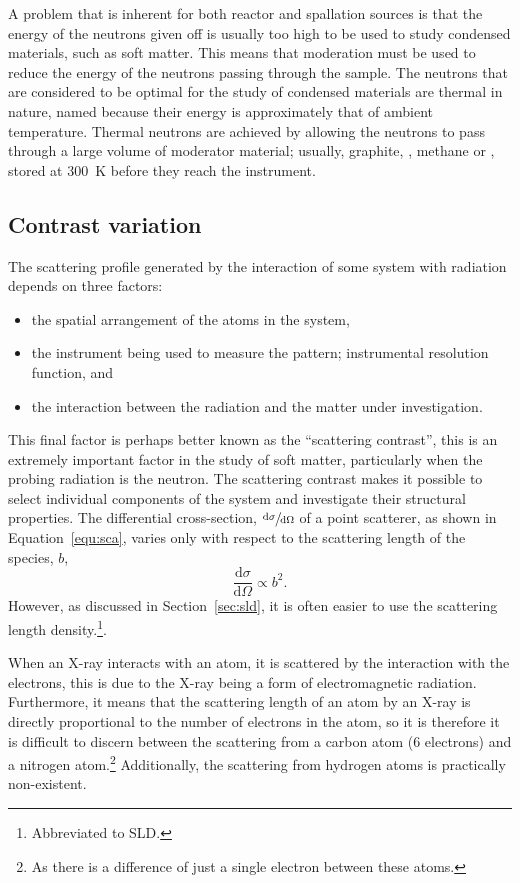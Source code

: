 A problem that is inherent for both reactor and spallation sources is that the energy of the neutrons given off is usually too high to be used to study condensed materials, such as soft matter.
This means that moderation must be used to reduce the energy of the neutrons passing through the sample.
The neutrons that are considered to be optimal for the study of condensed materials are thermal in nature, named because their energy is approximately that of ambient temperature.
Thermal neutrons are achieved by allowing the neutrons to pass through a large volume of moderator material; usually, graphite, , methane or , stored at \SI{300}{\kelvin} before they reach the instrument.

\subsection{Contrast variation}
\label{convar}
The scattering profile generated by the interaction of some system with radiation depends on three factors:
%
\begin{itemize}
    \item the spatial arrangement of the atoms in the system,
    \item the instrument being used to measure the pattern; instrumental resolution function, and
    \item the interaction between the radiation and the matter under investigation.
\end{itemize}
%
This final factor is perhaps better known as the ``scattering contrast'', this is an extremely important factor in the study of soft matter, particularly when the probing radiation is the neutron.
The scattering contrast makes it possible to select individual components of the system and investigate their structural properties.
The differential cross-section, $\sfrac{\text{d}\sigma}{\text{d}\Omega}$ of a point scatterer, as shown in Equation~\ref{equ:sca}, varies only with respect to the scattering length of the species, $b$,
%
\begin{equation}
    \frac{\text{d}\sigma}{\text{d}\Omega} \propto b^2.
\end{equation}
%
However, as discussed in Section~\ref{sec:sld}, it is often easier to use the scattering length density.\footnote{Abbreviated to SLD.}.

When an X-ray interacts with an atom, it is scattered by the interaction with the electrons, this is due to the X-ray being a form of electromagnetic radiation.
Furthermore, it means that the scattering length of an atom by an X-ray is directly proportional to the number of electrons in the atom, so it is therefore it is difficult to discern between the scattering from a carbon atom (6 electrons) and a nitrogen atom.\footnote{As there is a difference of just a single electron between these atoms.}
Additionally, the scattering from hydrogen atoms is practically non-existent.

